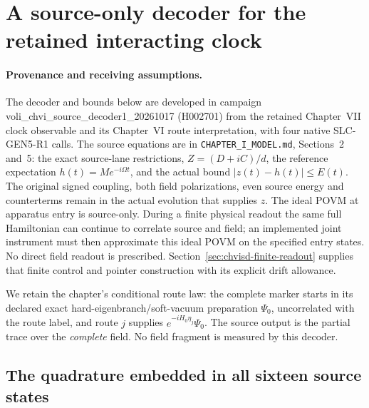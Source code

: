 
\section{A source-only decoder for the retained interacting clock}
\label{sec:chvi-source-decoder}

\paragraph{Provenance and receiving assumptions.}
The decoder and bounds below are developed in campaign
voli\_chvi\_source\_decoder1\_20261017 (H002701) from the retained
Chapter~VII clock observable and its Chapter~VI route interpretation, with
four native SLC-GEN5-R1 calls. The source equations are in
\texttt{CHAPTER\_I\_MODEL.md}, Sections~2 and~5: the exact source-lane
restrictions, $Z=(D+iC)/d$, the reference expectation
$h(t)=Me^{-i\Omega t}$, and the actual bound $|z(t)-h(t)|\leq E(t)$.
The original signed coupling, both field polarizations, even source energy
and counterterms remain in the actual evolution that supplies $z$.
The ideal POVM at apparatus entry is source-only. During a finite physical
readout the same full Hamiltonian can continue to correlate source and
field; an implemented joint instrument must then approximate this ideal
POVM on the specified entry states. No direct field readout is prescribed.
Section~\ref{sec:chvisd-finite-readout} supplies that finite control and
pointer construction with its explicit drift allowance.

We retain the chapter's conditional route law: the complete marker starts
in its declared exact hard-eigenbranch/soft-vacuum preparation $\Psi_0$,
uncorrelated with the route label, and route $j$ supplies
$e^{-iH_0\eta_j}\Psi_0$. The source output is the partial trace over the
\emph{complete} field. No field fragment is measured by this decoder.

\subsection{The quadrature embedded in all sixteen source states}

